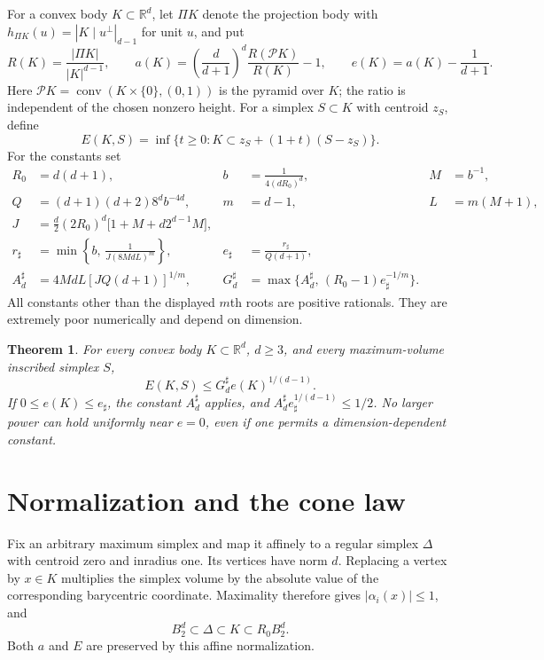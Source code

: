 \documentclass[11pt]{article}
\newtheorem{theorem}{Theorem}
\newcommand{\BB}{B_2^d}
\begin{document}
For a convex body $K\subset\mathbb R^d$, let $\Pi K$ denote the projection
body with $h_{\Pi K}(u)=|K\mid u^\perp|_{d-1}$ for unit $u$, and put
\[
 R(K)=\frac{|\Pi K|}{|K|^{d-1}},\qquad
 a(K)=\left(\frac d{d+1}\right)^d
       \frac{R(\mathcal P K)}{R(K)}-1,\qquad
 e(K)=a(K)-\frac1{d+1}.
\]
Here $\mathcal P K=\operatorname{conv}(K\times\{0\},(0,1))$ is the
pyramid over $K$; the ratio is independent of the chosen nonzero height.
For a simplex $S\subset K$ with centroid $z_S$, define
\[
 E(K,S)=\inf\{t\ge0:K\subset z_S+(1+t)(S-z_S)\}.
\]
For the constants set
\begin{align}
 R_0&=d(d+1),&
 b&=\frac1{4(dR_0)^d},&
 M&=b^{-1},\label{eq:constants1}\\
 Q&=(d+1)(d+2)8^d b^{-4d},&
 m&=d-1,&
 L&=m(M+1),\label{eq:constants2}\\
 J&=\frac d2(2R_0)^d
       \bigl[1+M+d2^{d-1}M\bigr],\label{eq:J}\\
 r_\sharp&=\min\left\{b,\,
             \frac1{J(8MdL)^m}\right\},&
 e_\sharp&=\frac{r_\sharp}{Q(d+1)},\label{eq:gate}\\
 A_d^\sharp&=4MdL[JQ(d+1)]^{1/m},&
 G_d^\sharp&=\max\{A_d^\sharp,\,
                    (R_0-1)e_\sharp^{-1/m}\}.\label{eq:global}
\end{align}
All constants other than the displayed $m$th roots are positive rationals.
They are extremely poor numerically and depend on dimension.

\begin{theorem}\label{thm:endpoint}
For every convex body $K\subset\mathbb R^d$, $d\ge3$, and every
maximum-volume inscribed simplex $S$,
\[
 E(K,S)\le G_d^\sharp e(K)^{1/(d-1)}.
\]
If $0\le e(K)\le e_\sharp$, the constant $A_d^\sharp$ applies, and
$A_d^\sharp e_\sharp^{1/(d-1)}\le1/2$.
No larger power can hold uniformly near $e=0$, even if one permits
a dimension-dependent constant.
\end{theorem}

\section{Normalization and the cone law}

Fix an arbitrary maximum simplex and map it affinely to a regular simplex
$\Delta$ with centroid zero and inradius one. Its vertices have norm $d$.
Replacing a vertex by $x\in K$ multiplies the simplex volume by the absolute
value of the corresponding barycentric coordinate. Maximality therefore
gives $|\alpha_i(x)|\le1$, and
\begin{equation}\label{eq:normalization}
 \BB\subset\Delta\subset K\subset R_0\BB.
\end{equation}
Both $a$ and $E$ are preserved by this affine normalization.
\end{document}
